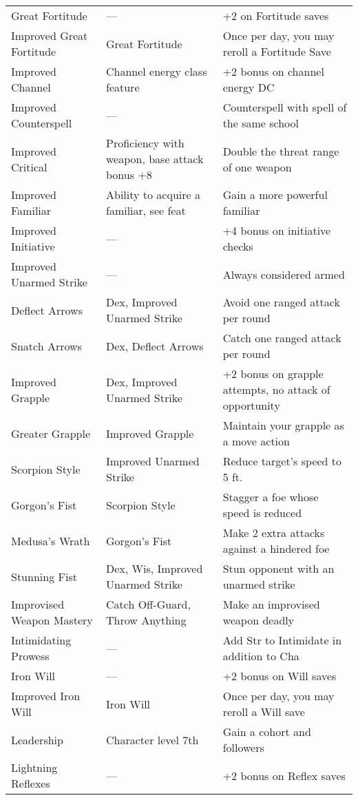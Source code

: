 \begin{table}[]
\begin{tabular}{lll}
Great Fortitude & — & +2 on Fortitude saves\\
\quad Improved Great Fortitude & Great Fortitude & Once per day, you may reroll a Fortitude Save\\
Improved Channel & Channel energy class feature & +2 bonus on channel energy DC\\
Improved Counterspell & — & Counterspell with spell of the same school\\
Improved Critical & Proficiency with weapon, base attack bonus +8 & Double the threat range of one weapon\\
Improved Familiar & Ability to acquire a familiar, see feat & Gain a more powerful familiar\\
Improved Initiative & — & +4 bonus on initiative checks\\
Improved Unarmed Strike & — & Always considered armed\\
\quad Deflect Arrows & Dex, Improved Unarmed Strike & Avoid one ranged attack per round\\
\quad \quad Snatch Arrows & Dex, Deflect Arrows & Catch one ranged attack per round\\
\quad Improved Grapple & Dex, Improved Unarmed Strike & +2 bonus on grapple attempts, no attack of opportunity\\
\quad \quad Greater Grapple & Improved Grapple & Maintain your grapple as a move action\\
\quad Scorpion Style & Improved Unarmed Strike & Reduce target's speed to 5 ft.\\
\quad \quad Gorgon's Fist & Scorpion Style & Stagger a foe whose speed is reduced\\
\quad \quad \quad Medusa's Wrath & Gorgon's Fist & Make 2 extra attacks against a hindered foe\\
\quad Stunning Fist & Dex, Wis, Improved Unarmed Strike & Stun opponent with an unarmed strike\\
Improvised Weapon Mastery & Catch Off-Guard, Throw Anything & Make an improvised weapon deadly\\
Intimidating Prowess & — & Add Str to Intimidate in addition to Cha \\
Iron Will & — & +2 bonus on Will saves\\
\quad Improved Iron Will & Iron Will & Once per day, you may reroll a Will save\\
Leadership & Character level 7th & Gain a cohort and followers\\
Lightning Reflexes & — & +2 bonus on Reflex saves\\

\end{tabular}
\end{table}
